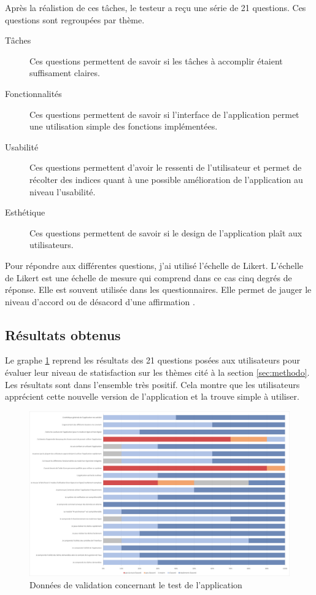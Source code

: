 \documentclass{EPL-master-thesis-covers-FR}
\begin{document}
				Après la réalistion de ces tâches, le testeur a reçu une série de 21 questions. Ces questions sont regroupées par thème.
				\begin{description}
					\item[Tâches] Ces questions permettent de savoir si les tâches à accomplir étaient suffisament claires.
					\item[Fonctionnalités]  Ces questions permettent de savoir si l'interface de l'application permet une utilisation simple des fonctions implémentées.
					\item[Usabilité] Ces questions permettent d'avoir le ressenti de l'utilisateur et permet de récolter des indices quant à une possible amélioration de l'application au niveau l'usabilité.
					\item[Esthétique] Ces questions permettent de savoir si le design de l'application plaît aux utilisateurs.
				\end{description}

				Pour répondre aux différentes questions, j'ai utilisé l'échelle de Likert. L'échelle de Likert est une échelle de mesure qui comprend dans ce cas cinq degrés de réponse. Elle est souvent utilisée dans les questionnaires. Elle permet de jauger le niveau d'accord ou de désacord d'une affirmation \cite{ref:likert}.
				
	
			\subsection*{Résultats obtenus}
				Le graphe \ref{fig:validation} reprend les résultats des 21 questions posées aux utilisateurs pour évaluer leur niveau de statisfaction sur les thèmes cité à la section \ref{sec:methodo}. Les résultats sont dans l'ensemble très positif. Cela montre que les utilisateurs apprécient cette nouvelle version de l'application et la trouve simple à utiliser. 
			
				\begin{figure}[H]
					\centering
					\includegraphics[width=1\textwidth]{images/validation}
					\caption{Données de validation concernant le test de l'application}
					\label{fig:validation}
				\end{figure}
		
\end{document}

